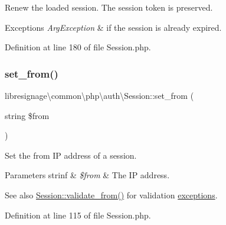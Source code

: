 Renew the loaded session. The session token is preserved.


\begin{DoxyExceptions}{Exceptions}
{\em Arg\+Exception} & if the session is already expired. \\
\hline
\end{DoxyExceptions}


Definition at line 180 of file Session.\+php.

\mbox{\label{classlibresignage_1_1common_1_1php_1_1auth_1_1Session_a3a6113a35af8eeeab6fa26a514ccdbed}} 
\subsubsection{\texorpdfstring{set\+\_\+from()}{set\_from()}}
{\footnotesize\ttfamily libresignage\textbackslash{}common\textbackslash{}php\textbackslash{}auth\textbackslash{}\+Session\+::set\+\_\+from (\begin{DoxyParamCaption}\item[{string}]{\$from }\end{DoxyParamCaption})}

Set the \textquotesingle{}from\textquotesingle{} IP address of a session.


\begin{DoxyParams}[1]{Parameters}
strinf & {\em \$from} & The IP address.\\
\hline
\end{DoxyParams}
\begin{DoxySeeAlso}{See also}
\hyperlink{classlibresignage_1_1common_1_1php_1_1auth_1_1Session_ac97b11d3fc056bc0cfdabde4b4d84911}{Session\+::validate\+\_\+from()} for validation \hyperlink{namespacelibresignage_1_1common_1_1php_1_1auth_1_1exceptions}{exceptions}. 
\end{DoxySeeAlso}


Definition at line 115 of file Session.\+php.

\mbox{\label{classlibresignage_1_1common_1_1php_1_1auth_1_1Session_aea393157c40941ef78ec2472ccdee9eb}} 
